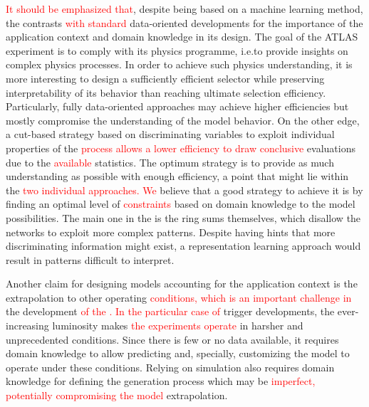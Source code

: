 \textcolor{red}{It should be emphasized that}, 
despite being based on a machine learning method, the \rnn{}
contrasts \textcolor{red}{with standard} data-oriented developments for the importance of the
application context and domain knowledge in its design. The goal of the ATLAS
experiment is to comply with its physics programme, i.e.\@ to provide insights on
complex physics processes. In order to achieve such physics understanding, it is
more interesting to design a sufficiently efficient selector while preserving
interpretability of its behavior than reaching ultimate selection efficiency.
Particularly, fully data-oriented approaches may achieve higher efficiencies but
mostly compromise the understanding of the model behavior. On the other edge,
a cut-based strategy based on discriminating variables to exploit individual
properties of the \textcolor{red}{process allows a lower efficiency to draw conclusive} evaluations due to the \textcolor{red}{available} statistics. The optimum strategy is to provide as
much understanding as possible with enough efficiency, a point that might lie
within the \textcolor{red}{two individual approaches. We} believe that a good strategy to achieve it is by
finding an optimal level of \textcolor{red}{constraints} based on domain knowledge to the model
possibilities. The main one in the \rnn{} is the ring sums themselves, which
disallow the networks to exploit more complex patterns. Despite having hints
that more discriminating information might exist, a representation learning
approach would result in patterns difficult to interpret.

Another claim for designing models accounting for the application context
is the extrapolation to other operating \textcolor{red}{conditions, which is an important challenge in} 
the development \textcolor{red}{ of the \rnn. In the particular case of }
trigger developments, the ever-increasing luminosity makes \textcolor{red}{the experiments operate} in harsher and
unprecedented conditions. Since there is few or no data available, it requires
domain knowledge to allow predicting and, specially, customizing the model to
operate under these conditions. Relying on simulation also requires domain
knowledge for defining the generation process which may be \textcolor{red}{imperfect, potentially compromising the model} extrapolation.

